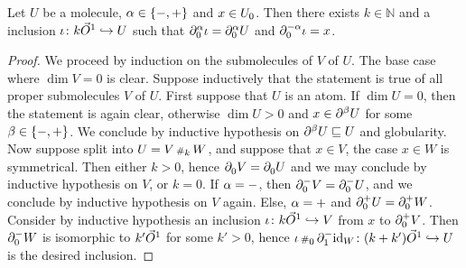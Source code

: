 \begin{lem} \label{lem:path_from_zero_bd_to_all_points}
    Let \( U \) be a molecule, \( \a \in \set{-, +} \) and \( x \in \gr{0}{U} \).
    Then there exists \( k \in \mathbb{N} \) and a inclusion \( \iota \colon k\dglobe{1} \incl U \) such that \( \bd{0}{\a} \iota = \bd{0}{\a} U \) and \( \bd{0}{-\a} \iota = x \).
\end{lem}
\begin{proof}
    We proceed by induction on the submolecules of \( V \) of \( U \).
    The base case where \( \dim V = 0 \) is clear.
    Suppose inductively that the statement is true of all proper submolecules \( V \) of \( U \).
    First suppose that \( U \) is an atom.
    If \( \dim U = 0 \), then the statement is again clear, otherwise \( \dim U > 0 \) and \( x \in \bd{}{\beta} U \) for some \( \beta \in \set{-, +} \).
    We conclude by inductive hypothesis on \( \bd{}{\beta} U \submol U \) and globularity.
    Now suppose split into \( U = V \cp{k} W \), and suppose that \( x \in V \), the case \( x \in W \) is symmetrical.
    Then either \( k > 0 \), hence \( \bd{0}{} V = \bd{0}{} U \) and we may conclude by inductive hypothesis on \( V \), or \( k = 0 \).
    If \( \a = - \), then \( \bd{0}{-} V = \bd{0}{-} U \), and we conclude by inductive hypothesis on \( V \) again.
    Else, \( \a = + \) and \( \bd{0}{+} U = \bd{0}{+} W \).
    Consider by inductive hypothesis an inclusion \( \iota \colon k\dglobe{1} \incl V \) from \( x \) to \( \bd{0}{+} V \).
    Then \( \bd{0}{-} W \) is isomorphic to \( k'\dglobe{1} \) for some \( k' > 0 \), hence \( \iota \cp{0} \bd{1}{-} \idd{W} \colon (k + k') \dglobe{1} \incl U \) is the desired inclusion.
\end{proof}

